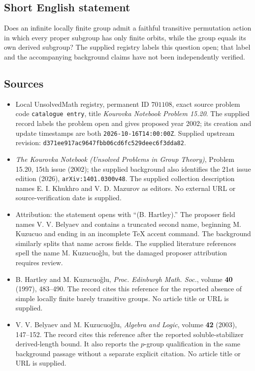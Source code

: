 \documentclass[11pt]{article}
\begin{document}
\subsection{Short English statement}
Does an infinite locally finite group admit a faithful transitive permutation action in which every proper subgroup has only finite orbits, while the group equals its own derived subgroup? The supplied registry labels this question open; that label and the accompanying background claims have not been independently verified.
\subsection{Sources}
\begin{itemize}
\item Local UnsolvedMath registry, permanent ID \(701108\), exact source problem code \texttt{catalogue entry}, title \emph{Kourovka Notebook Problem 15.20}. The supplied record labels the problem open and gives proposed year 2002; its creation and update timestamps are both \texttt{2026-10-16T14:00:00Z}. Supplied upstream revision: \texttt{d371ee917ac9647fbb06cd6fc529deec6f3dda82}.
\item \emph{The Kourovka Notebook (Unsolved Problems in Group Theory)}, Problem 15.20, 15th issue (2002); the supplied background also identifies the 21st issue edition (2026), \texttt{arXiv:1401.0300v48}. The supplied collection description names E. I. Khukhro and V. D. Mazurov as editors. No external URL or source-verification date is supplied.
\item Attribution: the statement opens with ``(B. Hartley).'' The proposer field names V. V. Belyaev and contains a truncated second name, beginning M. Kuzucuo and ending in an incomplete TeX accent command. The background similarly splits that name across fields. The supplied literature references spell the name M. Kuzucuo\v{g}lu, but the damaged proposer attribution requires review.
\item B. Hartley and M. Kuzucuo\v{g}lu, \emph{Proc. Edinburgh Math. Soc.}, volume \textbf{40} (1997), 483--490. The record cites this reference for the reported absence of simple locally finite barely transitive groups. No article title or URL is supplied.
\item V. V. Belyaev and M. Kuzucuo\v{g}lu, \emph{Algebra and Logic}, volume \textbf{42} (2003), 147--152. The record cites this reference after the reported soluble-stabilizer derived-length bound. It also reports the \(p\)-group qualification in the same background passage without a separate explicit citation. No article title or URL is supplied.
\end{itemize}
\end{document}
